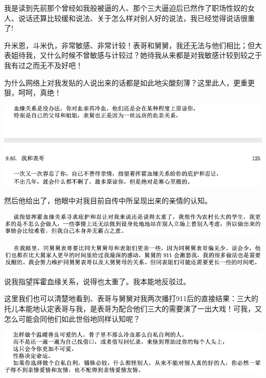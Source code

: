 \documentclass[9pt, b5paper]{article}
\begin{document}
我是读到先前那个曾经如我般被逼的人、那个三大逼迫后已然作了职场性奴的女人、说话还算比较缓和说法、关于怎么样对别人好的说法，我已经觉得说话很重了!

升米恩，斗米仇，非常敏感、非常计较！表哥和舅舅，我还无法与他们相比；但大表姐待我，又什么时候不曾敏感与计较过？她待我从来都是对我敏感计较到较之于我有过之而无不及好吧！

为什么网络上对我发贴的人说出来的话都是如此地尖酸刻薄？这里此人，更重更狠，呵呵，真绝！

\begin{center}
\includegraphics[width=.9\linewidth]{./pic/backups_plans_20210413_131357.png}
\end{center}

然后他给出了，他眼中对我目前自传中所呈现出来的亲情的认知。

\begin{center}
\includegraphics[width=.9\linewidth]{./pic/backups_plans_20210413_143417.png}
\end{center}

\begin{center}
\includegraphics[width=.9\linewidth]{./pic/backups_plans_20210413_143433.png}
\end{center}

说我指望挥霍血缘关系，说得也太重了。我本能地反驳过。 

这里我们也可以清楚地看到、表哥与舅舅对我两次播打911后的直接结果：三大的托儿本能地认定表哥与我，是表哥为配合他们三大的需要演了一出大戏！可我，又怎么可能会同他们如此世俗地同样认知呢？

\begin{center}
\includegraphics[width=.9\linewidth]{./pic/backups_plans_20210413_131623.png}
\end{center}
\end{document}
